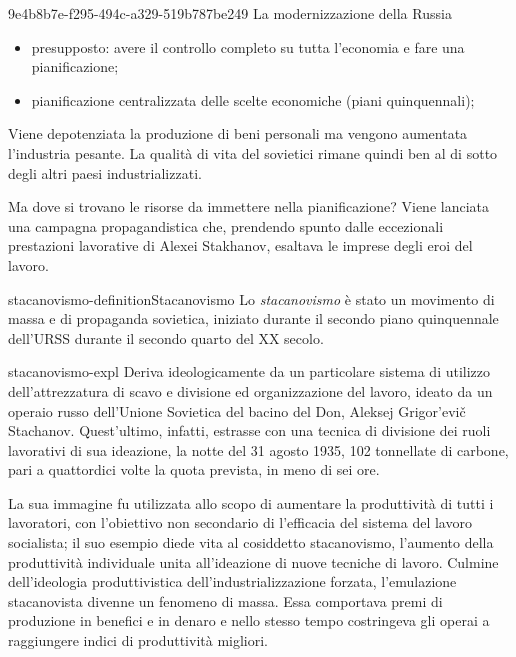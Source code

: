 \documentclass[preview]{standalone}
\begin{document}
\begin{snippet}{9e4b8b7e-f295-494c-a329-519b787be249}
    La modernizzazione della Russia
    \begin{itemize}
        \item presupposto: avere il controllo completo su tutta l'economia e fare una pianificazione;
        \item pianificazione centralizzata delle scelte economiche (piani quinquennali);
    \end{itemize}

    Viene depotenziata la produzione di beni personali ma vengono aumentata l'industria pesante.
    La qualità di vita del sovietici rimane quindi ben al di sotto degli altri paesi industrializzati.

    Ma dove si trovano le risorse da immettere nella pianificazione?
    Viene lanciata una campagna propagandistica che, prendendo spunto dalle eccezionali prestazioni
    lavorative di Alexei Stakhanov, esaltava le imprese degli eroi del lavoro.
\end{snippet}

\begin{snippetdefinition}{stacanovismo-definition}{Stacanovismo}
    Lo \textit{stacanovismo} è stato un movimento di massa e di propaganda
    sovietica, iniziato durante il secondo piano quinquennale
    dell'URSS durante il secondo quarto del XX secolo. 
\end{snippetdefinition}

\begin{snippet}{stacanovismo-expl}
    Deriva ideologicamente da un particolare sistema di utilizzo
    dell'attrezzatura di scavo e divisione ed organizzazione del lavoro,
    ideato da un operaio russo dell'Unione Sovietica del bacino del Don,
    Aleksej Grigor'evič Stachanov.
    Quest'ultimo, infatti, estrasse con una tecnica di divisione dei
    ruoli lavorativi di sua ideazione, la notte del 31 agosto 1935,
    102 tonnellate di carbone, pari a quattordici volte la quota prevista,
    in meno di sei ore.

    La sua immagine fu utilizzata allo scopo di aumentare la produttività di
    tutti i lavoratori, con l'obiettivo non secondario di
     l'efficacia del sistema del lavoro socialista;
    il suo esempio diede vita al cosiddetto stacanovismo,
    l'aumento della produttività individuale unita all'ideazione
    di nuove tecniche di lavoro. Culmine dell'ideologia produttivistica
    dell'industrializzazione forzata, l'emulazione stacanovista divenne un
    fenomeno di massa. Essa comportava premi di produzione in benefici e
    in denaro e nello stesso tempo costringeva gli operai a raggiungere indici di
    produttività migliori.
\end{snippet}
\end{document}
